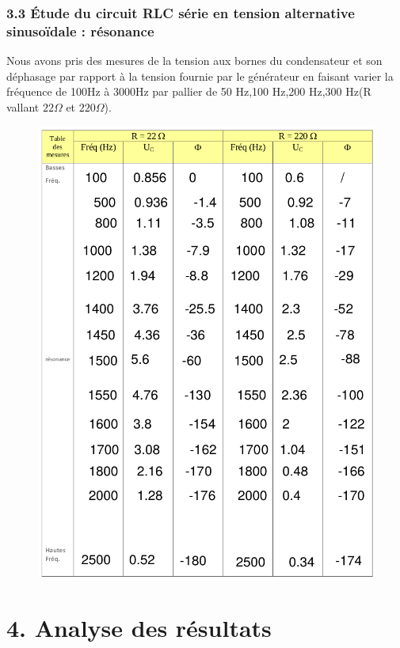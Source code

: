 \documentclass{report}
\begin{document}
\subsubsection*{3.3 Étude du circuit RLC série en tension alternative sinusoïdale : résonance}
Nous avons pris des mesures  de la tension aux bornes du condensateur et son déphasage par rapport à la tension fournie par le générateur en faisant varier la fréquence de 100Hz à 3000Hz par pallier de 50 Hz,100 Hz,200 Hz,300 Hz(R vallant $22\Omega$ et $220\Omega$).
\hspace*{0.5cm}
\begin{figure}[ht!]
\centering
\includegraphics[width=150mm]{tableau.png}
\label{overflow}
\end{figure}
\FloatBarrier

\section*{4. Analyse des résultats}
\end{document}
